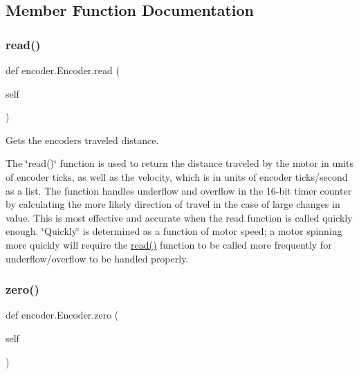 \subsection{Member Function Documentation}
\mbox{\label{classencoder_1_1Encoder_aa1c1535160682500f5214f45d8197027}} 
\subsubsection{\texorpdfstring{read()}{read()}}
{\footnotesize\ttfamily def encoder.\+Encoder.\+read (\begin{DoxyParamCaption}\item[{}]{self }\end{DoxyParamCaption})}



Gets the encoder\textquotesingle{}s traveled distance. 

The \char`\"{}read()\char`\"{} function is used to return the distance traveled by the motor in units of encoder ticks, as well as the velocity, which is in units of encoder ticks/second as a list. The function handles underflow and overflow in the 16-\/bit timer counter by calculating the more likely direction of travel in the case of large changes in value. This is most effective and accurate when the read function is called quickly enough. \char`\"{}\+Quickly\char`\"{} is determined as a function of motor speed; a motor spinning more quickly will require the \mbox{\hyperlink{classencoder_1_1Encoder_aa1c1535160682500f5214f45d8197027}{read()}} function to be called more frequently for underflow/overflow to be handled properly. \mbox{\label{classencoder_1_1Encoder_ae238ecdbcbce8a193c2e0ffbb4d1dd29}} 
\subsubsection{\texorpdfstring{zero()}{zero()}}
{\footnotesize\ttfamily def encoder.\+Encoder.\+zero (\begin{DoxyParamCaption}\item[{}]{self }\end{DoxyParamCaption})}



